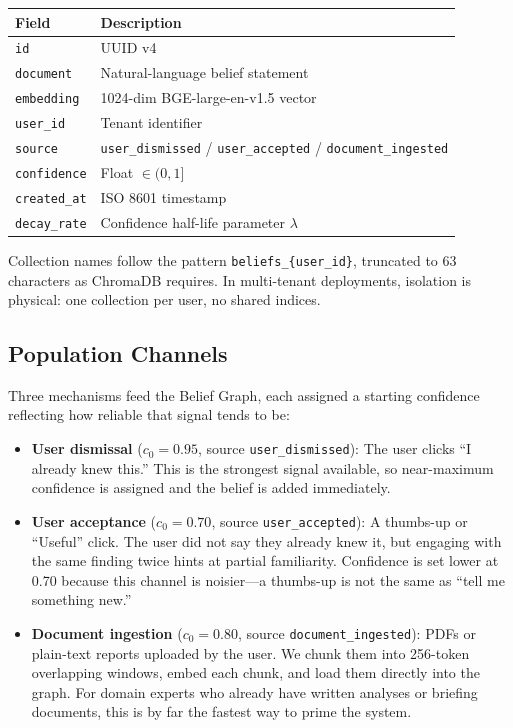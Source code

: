 \documentclass[conference]{IEEEtran}
\begin{document}
\begin{center}
\footnotesize
\begin{tabular}{@{}lp{4.8cm}@{}}
  \toprule
  \textbf{Field}   & \textbf{Description} \\
  \midrule
  \texttt{id}         & UUID v4 \\
  \texttt{document}   & Natural-language belief statement \\
  \texttt{embedding}  & 1024-dim BGE-large-en-v1.5 vector \\
  \texttt{user\_id}   & Tenant identifier \\
  \texttt{source}     & \texttt{user\_dismissed} /
                        \texttt{user\_accepted} /
                        \texttt{document\_ingested} \\
  \texttt{confidence} & Float $\in (0, 1]$ \\
  \texttt{created\_at}& ISO 8601 timestamp \\
  \texttt{decay\_rate}& Confidence half-life parameter $\lambda$ \\
  \bottomrule
\end{tabular}
\end{center}

Collection names follow the pattern \texttt{beliefs\_\{user\_id\}},
truncated to 63 characters as ChromaDB requires. In multi-tenant
deployments, isolation is physical: one collection per user, no
shared indices.

\subsection{Population Channels}

Three mechanisms feed the Belief Graph, each assigned a starting
confidence reflecting how reliable that signal tends to be:

\begin{itemize}
  \item \textbf{User dismissal} ($c_0 = 0.95$, source
  \texttt{user\_dismissed}): The user clicks ``I already knew
  this.'' This is the strongest signal available, so near-maximum
  confidence is assigned and the belief is added immediately.

  \item \textbf{User acceptance} ($c_0 = 0.70$, source
  \texttt{user\_accepted}): A thumbs-up or ``Useful'' click.
  The user did not say they already knew it, but engaging with
  the same finding twice hints at partial familiarity. Confidence
  is set lower at 0.70 because this channel is noisier---a
  thumbs-up is not the same as ``tell me something new.''

  \item \textbf{Document ingestion} ($c_0 = 0.80$, source
  \texttt{document\_ingested}): PDFs or plain-text reports
  uploaded by the user. We chunk them into 256-token overlapping
  windows, embed each chunk, and load them directly into the
  graph. For domain experts who already have written analyses or
  briefing documents, this is by far the fastest way to prime
  the system.
\end{itemize}
\end{document}
